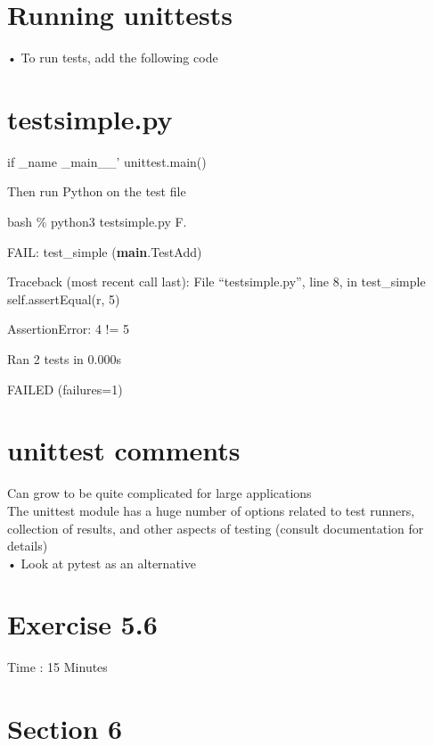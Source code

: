 \documentclass[
  letterpaper,
  DIV=11,
  numbers=noendperiod]{scrreprt}
\begin{document}
\chapter{Running unittests}\label{running-unittests}

• To run tests, add the following code


\chapter{testsimple.py}\label{testsimple.py}

if \_name \_main\_\_' unittest.main()

Then run Python on the test file

bash \% python3 testsimple.py F.

FAIL: test\_simple (\textbf{main}.TestAdd)

Traceback (most recent call last): File ``testsimple.py'', line 8, in
test\_simple self.assertEqual(r, 5)

AssertionError: 4 != 5

Ran 2 tests in 0.000s

FAILED (failures=1)


\chapter{unittest comments}\label{unittest-comments}

Can grow to be quite complicated for large applications\\
The unittest module has a huge number of options related to test
runners, collection of results, and other aspects of testing (consult
documentation for details)\\
• Look at pytest as an alternative


\chapter{Exercise 5.6}\label{exercise-5.6}

Time : 15 Minutes


\chapter{Section 6}\label{section-6}
\end{document}
